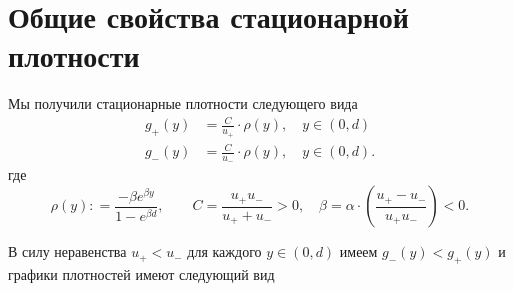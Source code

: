 \documentclass[12pt,a4paper]{article}
\begin{document}
\section{Общие свойства стационарной плотности}
Мы получили стационарные плотности следующего вида 
\begin{equation*}
    \begin{aligned}
        g_+ (y) &= \frac{C}{u_+} \cdot \rho (y), \quad y \in (0, d)\\
g_-(y) &= \frac{C}{u_-} \cdot \rho (y), \quad y \in (0, d).
    \end{aligned}
\end{equation*}
где
$$\rho (y) : = \frac{- \beta e^{\beta y}}{1 - e^{\beta d}}, \qquad C = \displaystyle \frac{u_+ u_-}{u_+ + u_-} > 0, \quad \beta = \alpha \cdot \left( \displaystyle\frac{u_+ - u_-}{u_+ u_-}\right) < 0.$$

В силу неравенства $u_+ < u_-$ для каждого $y \in (0, d)$ имеем $g_- (y) < g_+ (y)$ и графики плотностей имеют следующий вид
\begin{center}
\end{center}
\end{document}
